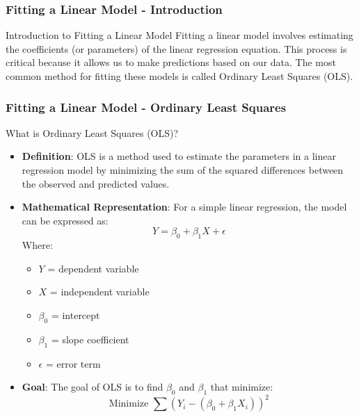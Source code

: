 \documentclass{beamer}
\begin{document}
\begin{frame}[fragile]
    \frametitle{Fitting a Linear Model - Introduction}
    \begin{block}{Introduction to Fitting a Linear Model}
        Fitting a linear model involves estimating the coefficients (or parameters) of the linear regression equation. This process is critical because it allows us to make predictions based on our data. The most common method for fitting these models is called Ordinary Least Squares (OLS).
    \end{block}
\end{frame}

\begin{frame}[fragile]
    \frametitle{Fitting a Linear Model - Ordinary Least Squares}
    \begin{block}{What is Ordinary Least Squares (OLS)?}
        \begin{itemize}
            \item \textbf{Definition}: OLS is a method used to estimate the parameters in a linear regression model by minimizing the sum of the squared differences between the observed and predicted values.
            \item \textbf{Mathematical Representation}: For a simple linear regression, the model can be expressed as:
            \begin{equation}
                Y = \beta_0 + \beta_1X + \epsilon
            \end{equation}
            Where:
            \begin{itemize}
                \item \(Y\) = dependent variable
                \item \(X\) = independent variable
                \item \(\beta_0\) = intercept
                \item \(\beta_1\) = slope coefficient
                \item \(\epsilon\) = error term
            \end{itemize}
            \item \textbf{Goal}: The goal of OLS is to find \(\beta_0\) and \(\beta_1\) that minimize:
            \begin{equation}
                \text{Minimize } \sum (Y_i - (\beta_0 + \beta_1X_i))^2
            \end{equation}
        \end{itemize}
    \end{block}
\end{frame}
\end{document}
